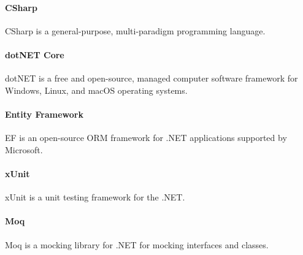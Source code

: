 \paragraph{CSharp}
CSharp is a general-purpose, multi-paradigm programming language.

\paragraph{dotNET Core}
dotNET is a free and open-source, managed computer software framework for Windows, Linux, and macOS operating systems.

\paragraph{Entity Framework}
EF is an open-source ORM framework for .NET applications supported by Microsoft.

\paragraph{xUnit}
xUnit is a unit testing framework for the .NET.

\paragraph{Moq}
Moq is a mocking library for .NET for mocking interfaces and classes.
